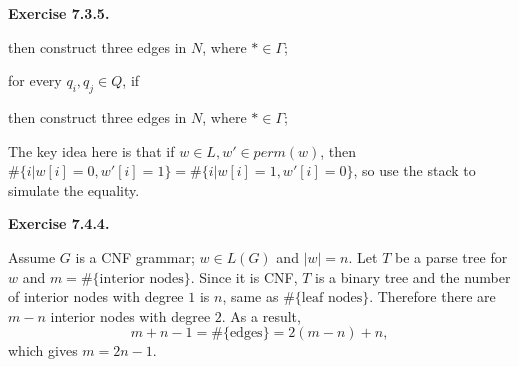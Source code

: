 \documentclass[a4paper]{article}
\newenvironment{exercise}[1]{
	\par
	\noindent\textbf{Exercise #1.}\quad
}{
	\par
	\bigskip
}
\begin{document}
\begin{exercise}{7.3.5}
\begin{itemize}
            then construct three edges in $N$, where $*\in\Gamma$;
            \begin{center}
            \end{center}
            for every $q_i,q_j\in Q$, if
            \begin{center}
            \end{center}
            then construct three edges in $N$, where $*\in\Gamma$;
            \begin{center}
            \end{center}
        \end{itemize}
        The key idea here is that if $w\in L,w'\in\textit{perm}(w)$, then $\#\{i|w[i]=0,w'[i]=1\}=\#\{i|w[i]=1,w'[i]=0\}$,
        so use the stack to simulate the equality.
\end{exercise}

\begin{exercise}{7.4.4} 
        Assume $G$ is a CNF grammar; $w\in L(G)$ and $|w|=n$. Let $T$ be a parse tree for
        $w$ and $m=\#\{\text{interior nodes}\}$. Since it is CNF, $T$ is a binary tree
        and the number of interior nodes with degree $1$ is $n$, same as $\#\{\text{leaf nodes}\}$.
        Therefore there are $m-n$ interior nodes with degree $2$.
        As a result,
        $$
        m+n-1=\#\{\text{edges}\}=2(m-n)+n,
        $$
        which gives $m=2n-1$.
\end{exercise}
\end{document}
